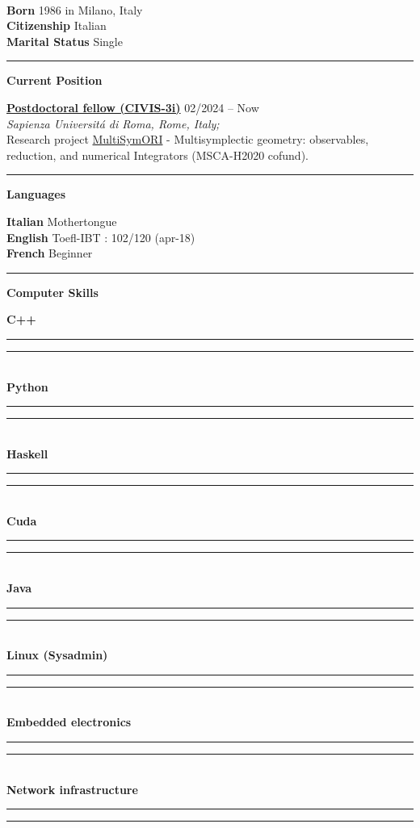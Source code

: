 \documentclass[a4paper]{article}
\newcommand{\crule}[3][black]{\textcolor{#1}{\rule{#2}{#3}}}
\newcommand{\progbar}[4][black]{\crule[#1]{#3}{#4}\crule[#1!10!white!90]{#2}{#4}}
\newcommand{\block}[1]{\hrule \vspace{0.2cm} \textbf{\Large #1} \vspace{0.2cm}}
\newcommand{\voice}[5]{\href{#4}{\textbf{#1}} \hfill #2 \\ \textit{#3} \\ {\small #5} \vspace{0.2cm} \\}
\newcommand{\skill}[2]{\textbf{#1} \hfill #2 \\}
\newcommand{\skillbar}[4]{\textbf{#1} \hfill \progbar{#2}{#3}{#4} \\}
\begin{document}
	\vfill

	\tableofcontents
	
	\vfill

	\clearpage

	\begin{minipage}[c]{0.6\columnwidth}
		\\
	\end{minipage} 
	\hfill
	\begin{minipage}[t]{0.37\columnwidth}
		\skill{Born}{1986 in Milano, Italy }
		\skill{Citizenship}{Italian }
		\skill{Marital Status}{Single }
	\end{minipage}
	\vspace{-0.25em}

	\begin{minipage}[t]{0.6\columnwidth}

		\block{Current Position}

		\voice{Postdoctoral fellow (CIVIS-3i)}
			{02/2024 -- Now}
			{Sapienza Universit\'a di Roma, Rome, Italy;}
			{https://civis3i.univ-amu.fr/en/civis3i-alliance-programme}       
			{Research project \href{https://civis3i.univ-amu.fr/en/antonio-michele-miti}{MultiSymORI} - Multisymplectic geometry: observables, reduction, and numerical Integrators (MSCA-H2020 cofund).\vspace{-0.25cm}}


	\end{minipage} 
	\hfill
	\begin{minipage}[t]{0.375\columnwidth}


		\block{Languages} 
		
		\skill{Italian}{Mothertongue}
		\skill{English}{Toefl-IBT : 102/120 (apr-18)}
		\skill{French}{Beginner}


		\block{Computer Skills} 
		
		\skillbar{C++}
			{1.4cm}
			{0.6cm}
			{0.25cm}
		\skillbar{Python}
			{1.1cm}
			{0.9cm}
			{0.25cm}
		\skillbar{Haskell}
			{1.5cm}
			{0.5cm}
			{0.25cm}
		\skillbar{Cuda}
			{1.1cm}
			{0.9cm}
			{0.25cm}
		\skillbar{Java}
			{1.2cm}
			{0.8cm}
			{0.25cm}
		\skillbar{Linux (Sysadmin)}
			{0.7cm}
			{1.3cm}
			{0.25cm}
		\skillbar{Embedded electronics}
			{1.5cm}
			{0.5cm}
			{0.25cm}
		\skillbar{Network infrastructure}
			{1.6cm}
			{0.4cm}
			{0.25cm}
	\end{minipage}
\end{document}
